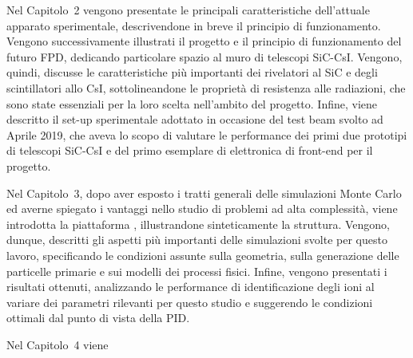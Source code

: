 Nel Capitolo~2 vengono presentate le principali caratteristiche dell'attuale apparato sperimentale, descrivendone in breve il principio di funzionamento.
Vengono successivamente illustrati il progetto e il principio di funzionamento del futuro FPD, dedicando particolare spazio al muro di telescopi SiC-CsI.
Vengono, quindi, discusse le caratteristiche più importanti dei rivelatori al SiC e degli scintillatori allo CsI, sottolineandone le proprietà di resistenza alle radiazioni, che sono state essenziali per la loro scelta nell'ambito del progetto.
Infine, viene descritto il set-up sperimentale adottato in occasione del test beam svolto ad Aprile 2019, che aveva lo scopo di valutare le performance dei primi due prototipi di telescopi SiC-CsI e del primo esemplare di elettronica di front-end per il progetto.

Nel Capitolo~3, dopo aver esposto i tratti generali delle simulazioni Monte Carlo ed averne spiegato i vantaggi nello studio di problemi ad alta complessità, viene introdotta la piattaforma \geant{}, illustrandone sinteticamente la struttura.
Vengono, dunque, descritti gli aspetti più importanti delle simulazioni svolte per questo lavoro, specificando le condizioni assunte sulla geometria, sulla generazione delle particelle primarie e sui modelli dei processi fisici.
Infine, vengono presentati i risultati ottenuti, analizzando le performance di identificazione degli ioni al variare dei parametri rilevanti per questo studio e suggerendo le condizioni ottimali dal punto di vista della PID.
 
Nel Capitolo~4 viene 


